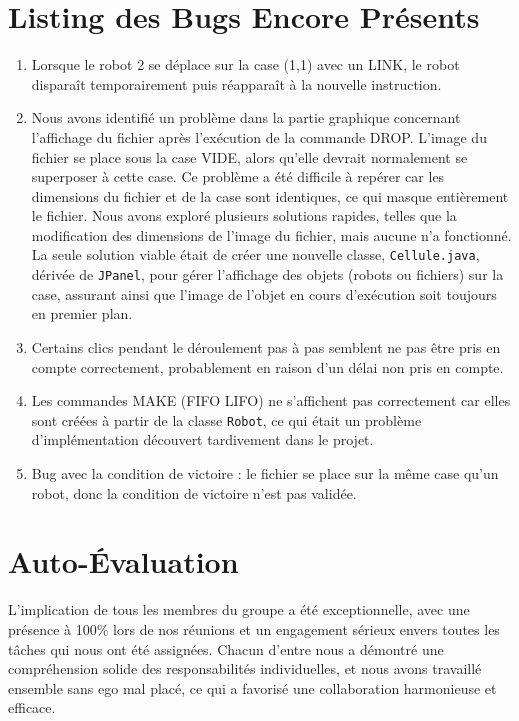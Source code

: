 \documentclass{article}
\begin{document}
\section{Listing des Bugs Encore Présents}
\begin{enumerate}
\item Lorsque le robot 2 se déplace sur la case (1,1) avec un LINK, le robot disparaît temporairement puis réapparaît à la nouvelle instruction.
\item Nous avons identifié un problème dans la partie graphique concernant l'affichage du fichier après l'exécution de la commande DROP. L'image du fichier se place sous la case VIDE, alors qu'elle devrait normalement se superposer à cette case. Ce problème a été difficile à repérer car les dimensions du fichier et de la case sont identiques, ce qui masque entièrement le fichier. Nous avons exploré plusieurs solutions rapides, telles que la modification des dimensions de l'image du fichier, mais aucune n'a fonctionné. La seule solution viable était de créer une nouvelle classe, \texttt{Cellule.java}, dérivée de \texttt{JPanel}, pour gérer l'affichage des objets (robots ou fichiers) sur la case, assurant ainsi que l'image de l'objet en cours d'exécution soit toujours en premier plan.
\item Certains clics pendant le déroulement pas à pas semblent ne pas être pris en compte correctement, probablement en raison d'un délai non pris en compte.
\item Les commandes MAKE (FIFO LIFO) ne s'affichent pas correctement car elles sont créées à partir de la classe \texttt{Robot}, ce qui était un problème d'implémentation découvert tardivement dans le projet.
\item Bug avec la condition de victoire : le fichier se place sur la même case qu'un robot, donc la condition de victoire n'est pas validée.
\end{enumerate}


\section{Auto-Évaluation}

L'implication de tous les membres du groupe a été exceptionnelle, avec une présence à 100\% lors de nos réunions et un engagement sérieux envers toutes les tâches qui nous ont été assignées. Chacun d'entre nous a démontré une compréhension solide des responsabilités individuelles, et nous avons travaillé ensemble sans ego mal placé, ce qui a favorisé une collaboration harmonieuse et efficace.
\end{document}
